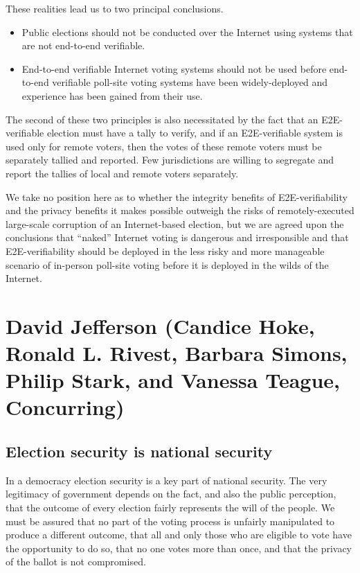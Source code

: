These realities lead us to two principal conclusions.

\begin{itemize}
\item Public elections should not be conducted over the Internet
using systems that are not end-to-end verifiable.

\item End-to-end verifiable Internet voting systems should not be
used before end-to-end verifiable poll-site voting systems have been
widely-deployed and experience has been gained from their use.
\end{itemize}

The second of these two principles is also necessitated by the fact
that an E2E-verifiable election must have a tally to verify, and if an
E2E-verifiable system is used only for remote voters, then the votes
of these remote voters must be separately tallied and reported.  Few
jurisdictions are willing to segregate and report the tallies of local
and remote voters separately. 

We take no position here as to whether the integrity benefits of
E2E-verifiability and the privacy benefits it makes possible outweigh
the risks of remotely-executed large-scale corruption of an
Internet-based election, but we are agreed upon the conclusions that
“naked” Internet voting is dangerous and irresponsible and that
E2E-verifiability should be deployed in the less risky and more
manageable scenario of in-person poll-site voting before it is
deployed in the wilds of the Internet.

\section{David Jefferson (Candice Hoke, Ronald L. Rivest, Barbara
  Simons, Philip Stark, and Vanessa Teague, Concurring)}

\subsection{Election security is national security}

In a democracy election security is a key part of national
security. The very legitimacy of government depends on the fact, and
also the public perception, that the outcome of every election fairly
represents the will of the people. We must be assured that no part of
the voting process is unfairly manipulated to produce a different
outcome, that all and only those who are eligible to vote have the
opportunity to do so, that no one votes more than once, and that the
privacy of the ballot is not compromised.

